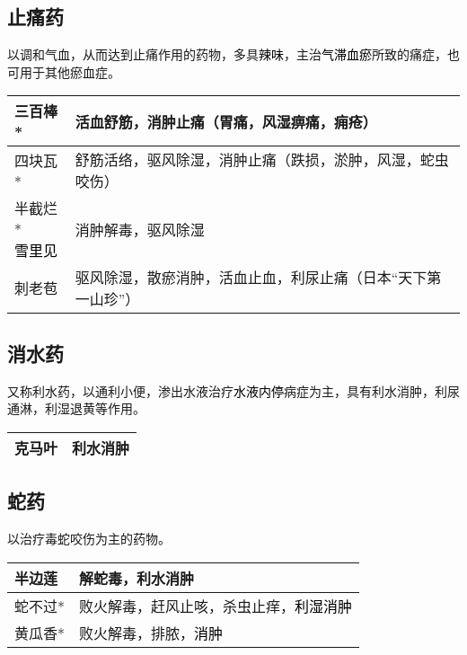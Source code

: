 \documentclass[cn,hazy,black,12pt,normal,founder]{elegantnote}
\newcommand{\redt}[1]{\textcolor{black}{{}#1}}      %
\begin{document}
\subsection{止痛药}

以调和气血，从而达到止痛作用的药物，多具\redt{辣味}，主治\redt{气滞血瘀}所致的痛症，也可用于其他瘀血症。

\begin{table}[H]
  \begin{tabular}{|l|l|}
  \hline
  三百棒* & 活血舒筋，消肿止痛（胃痛，风湿痹痛，痈疮） \\ \hline
  四块瓦* & 舒筋活络，驱风除湿，消肿止痛（跌损，淤肿，风湿，蛇虫咬伤） \\ \hline
  \makecell[l]{半截烂* \\ \redt{雪里见}} & 消肿解毒，驱风除湿 \\ \hline
  刺老苞 & 驱风除湿，散瘀消肿，活血止血，利尿止痛（日本“天下第一山珍”） \\ \hline
  \end{tabular}
\end{table}

\subsection{消水药}

又称利水药，以通利小便，渗出水液治疗\redt{水液内停}病症为主，具有利水消肿，利尿通淋，利湿退黄等作用。

\begin{table}[H]
  \begin{tabular}{|l|l|}
  \hline
  克马叶 & 利水消肿 \\ \hline
  \end{tabular}
\end{table}

\subsection{蛇药}

以治疗毒蛇咬伤为主的药物。

\begin{table}[H]
  \begin{tabular}{|l|l|}
  \hline
  半边莲 & 解蛇毒，利水消肿 \\ \hline
  蛇不过* & 败火解毒，赶风止咳，杀虫止痒，\redt{利湿消肿}  \\ \hline
  黄瓜香* & 败火解毒，排脓，\redt{消肿} \\ \hline
  \end{tabular}
\end{table}
\end{document}
